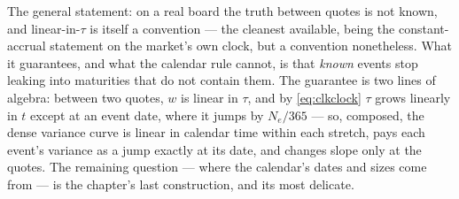 The general statement: on a real board the truth between
quotes is not known, and linear-in-$\tau$ is itself a convention ---
the cleanest available, being the constant-accrual statement on the
market's own clock, but a convention nonetheless.  What it
guarantees, and what the calendar rule cannot, is that \emph{known}
events stop leaking into maturities that do not contain them.  The
guarantee is two lines of algebra: between two quotes, $w$ is linear
in $\tau$, and by \eqref{eq:clkclock} $\tau$ grows linearly in $t$
except at an event date, where it jumps by $N_e/365$ --- so,
composed, the dense variance curve is linear in calendar time within
each stretch, pays each event's variance as a jump exactly at its
date, and changes slope only at the quotes.  The remaining question --- where the calendar's dates
and sizes come from --- is the chapter's last construction, and its
most delicate.
